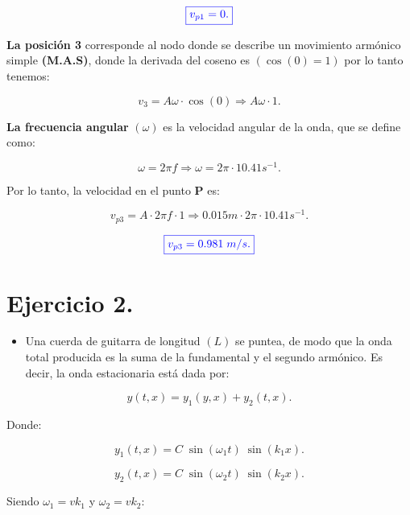\documentclass[a4paper,12pt]{article} %
\begin{document}
\[\textcolor{blue}{\boxed{v_{p1} = 0.}}\]

\newpage

\begin{justify}
    \textbf{La posición 3} corresponde al nodo donde se describe un movimiento armónico simple \textbf{(M.A.S)}, donde la derivada del coseno es \(\left(\cos(0) = 1\right)\) por lo tanto tenemos:
\end{justify}

\[ v_3 = A \omega \cdot \cos(0) \Rightarrow A \omega \cdot 1. \]

\begin{justify}
    \textbf{La frecuencia angular} \((\omega)\) es la velocidad angular de la onda, que se define como:

    \[ \omega = 2 \pi f \Rightarrow \omega = 2 \pi \cdot 10.41 s^{-1}. \]
\end{justify}

\begin{justify}
    Por lo tanto, la velocidad en el punto \textbf{P} es:
\end{justify}

\[ v_{p3} = A \cdot 2 \pi f \cdot 1 \Rightarrow 0.015m \cdot 2 \pi \cdot 10.41 s^{-1}. \]

\[ \textcolor{blue}{\boxed{v_{p3} = 0.981 \; m/s.}} \]

\vspace{\baselineskip}

\section{Ejercicio 2.}

\vspace{\baselineskip}

\begin{itemize}
    \item Una cuerda de guitarra de longitud \((L)\) se puntea, de modo que la onda
    total producida es la suma de la fundamental y el segundo armónico. 
    Es decir, la onda estacionaria está dada por:
\end{itemize}

\[y\left(t,x\right) = y_1(y,x) + y_2 (t,x).\]

Donde:

\[ y_1(t,x) = C \; \sin \left(\omega_1 t\right) \; \sin (k_1x). \]

\[ y_2(t,x) = C \; \sin \left(\omega_2 t\right) \; \sin (k_2x). \]

\begin{justify}
    Siendo \(\omega_1 = vk_1\) y \(\omega_2 = vk_2\):
\end{justify}
\end{document}
